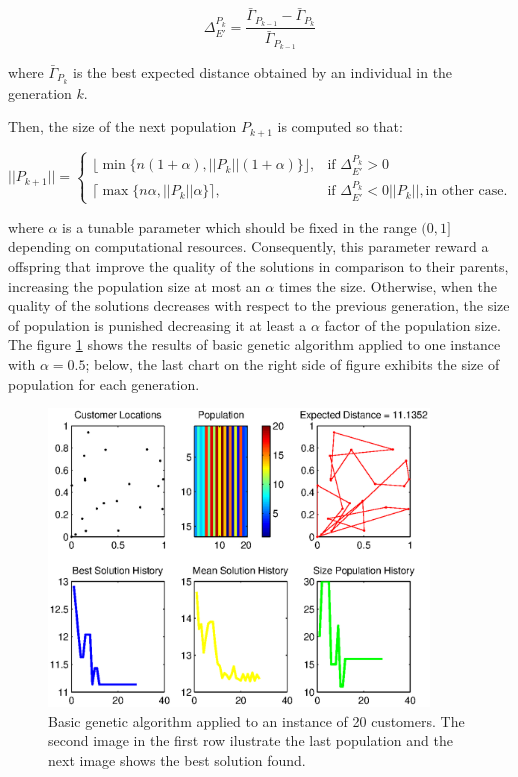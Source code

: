 \begin{equation}\label{eq:improve_fitness}
 \Delta^{P_k}_{E'} = \frac{\bar{\Gamma}_{P_{k-1}} - \bar{\Gamma}_{P_k}}{\bar{\Gamma}_{P_{k-1}}} 
\end{equation}

where $\bar{\Gamma}_{P_k}$ is the best expected distance obtained by an individual in the generation $k$.

Then, the size of the next population $P_{k+1}$ is computed so that:

\begin{equation}\label{eq:population_size}
 ||P_{k+1}|| = \left \{ \begin{array}{ll}
  \lfloor  \min\{n(1+\alpha), ||P_{k}||(1+\alpha)\} \rfloor, & \text{if } \Delta^{P_k}_{E'} > 0\\
  \lceil \max\{n\alpha, ||P_{k}||\alpha\} \rceil, & \text{if } \Delta^{P_k}_{E'} < 0
  ||P_{k}||, \text{in other case.}
  \end{array} \right.
\end{equation}


where $\alpha$ is a tunable parameter which should be fixed in the range $(0,1]$ depending on computational resources. Consequently, this parameter reward a offspring that improve the quality of the solutions in comparison to their parents, increasing the population size at most an $\alpha$ times the size. Otherwise, when the quality of the solutions decreases with respect to the previous generation, the size of population is punished decreasing it at least a $\alpha$ factor of the population size. The figure \ref{fig:ga_basic_mvi_20r4_m} shows the results of basic genetic algorithm applied to one instance with $\alpha = 0.5$; below, the last chart on the right side of figure exhibits the size of population for each generation.

\begin{figure}[!htbp]
  \begin{center}
   \includegraphics[width=0.9\textwidth]{Images/Chapter3/mvi_20r4_m_regular.eps}
  \end{center}
    \caption{Basic genetic algorithm applied to an instance of 20 customers. The second image in the first row ilustrate the last population and the next image shows the best solution found. }\label{fig:ga_basic_mvi_20r4_m}
\end{figure}

